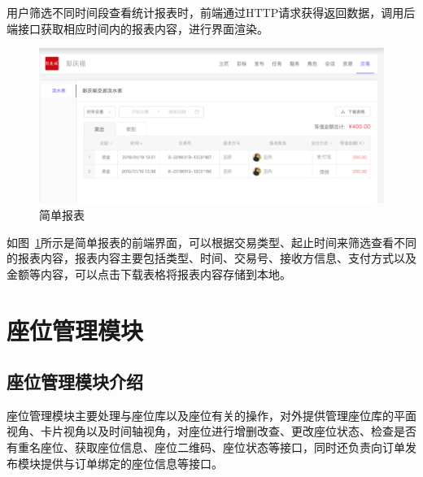 用户筛选不同时间段查看统计报表时，前端通过HTTP请求获得返回数据，调用后端接口获取相应时间内的报表内容，进行界面渲染。

\begin{figure}[htbp!]
    \centering
    \includegraphics[width=\linewidth]{FIGs/chapter4/table_figure.pdf}
    \caption{简单报表}\label{fig_table_figure}
\end{figure}

如图~\ref{fig_table_figure}所示是简单报表的前端界面，可以根据交易类型、起止时间来筛选查看不同的报表内容，报表内容主要包括类型、时间、交易号、接收方信息、支付方式以及金额等内容，可以点击下载表格将报表内容存储到本地。

\section{座位管理模块}
\subsection{座位管理模块介绍}
座位管理模块主要处理与座位库以及座位有关的操作，对外提供管理座位库的平面视角、卡片视角以及时间轴视角，对座位进行增删改查、更改座位状态、检查是否有重名座位、获取座位信息、座位二维码、座位状态等接口，同时还负责向订单发布模块提供与订单绑定的座位信息等接口。\\


